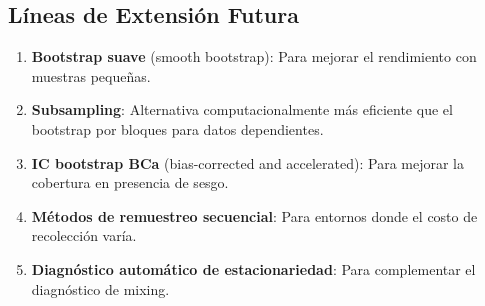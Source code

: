\documentclass[12pt,a4paper]{article}
\begin{document}
\subsection{Líneas de Extensión Futura}

\begin{enumerate}
	\item \textbf{Bootstrap suave} (smooth bootstrap): Para mejorar el rendimiento con muestras pequeñas.
	\item \textbf{Subsampling}: Alternativa computacionalmente más eficiente que el bootstrap por bloques para datos dependientes.
	\item \textbf{IC bootstrap BCa} (bias-corrected and accelerated): Para mejorar la cobertura en presencia de sesgo.
	\item \textbf{Métodos de remuestreo secuencial}: Para entornos donde el costo de recolección varía.
	\item \textbf{Diagnóstico automático de estacionariedad}: Para complementar el diagnóstico de mixing.
\end{enumerate}
\end{document}
